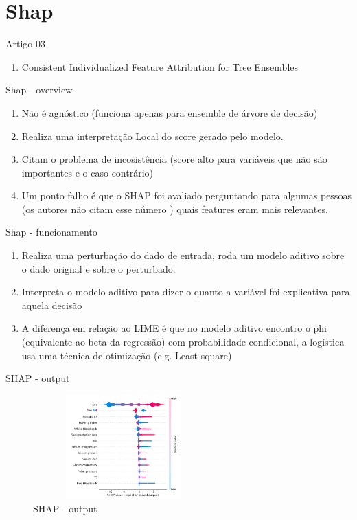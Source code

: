 \section{Shap}

\begin{frame}
	\begin{block}{Artigo 03}
	\begin{enumerate}
		\item Consistent Individualized Feature Attribution for Tree Ensembles
	\end{enumerate}
	\end{block}
\end{frame}


\begin{frame}
	\begin{block}{Shap - overview}
		\begin{enumerate}
			\item Não é agnóstico (funciona apenas para ensemble de árvore de decisão)
			\item Realiza uma interpretação Local do score gerado pelo modelo.
			\item Citam o problema de incosistência (score alto para variáveis que não são importantes e o caso contrário) 
			\item Um ponto falho é que o SHAP foi avaliado perguntando para algumas pessoas (os autores não citam esse número ) quais features eram mais relevantes.
		\end{enumerate}
	\end{block}
\end{frame}

\begin{frame}
	\begin{block}{Shap - funcionamento}
			\begin{enumerate}
				\item Realiza uma perturbação do dado de entrada, roda um modelo aditivo sobre o dado orignal e sobre o perturbado.
				\item Interpreta o modelo aditivo para dizer o quanto a variável foi explicativa para aquela decisão
				\item A diferença em relação ao LIME é que no modelo aditivo encontro o phi (equivalente ao beta da regressão) com probabilidade condicional, a logística usa uma técnica de otimização  (e.g. Least square)
			\end{enumerate}
	\end{block}
\end{frame}

\begin{frame}
	\begin{block}{SHAP - output}
		\begin{figure}[!htb]
			\centering	  				
			\includegraphics[height=4cm, width = 7cm]{./pic/shapModel.png}
			\caption{SHAP - output \cite{SHAP}}
			\label{fig_ds_process}
		\end{figure}	
	\end{block}
\end{frame}

